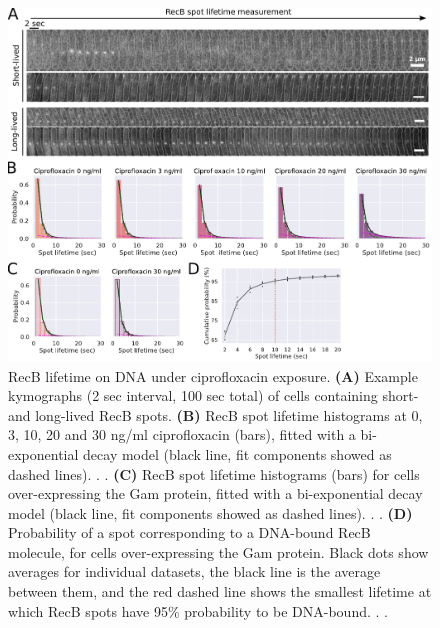 \begin{figure}[htbp]
    \centering
    \includegraphics[width=.8\textwidth]{Figures/Fig2_RecB_lifetime.pdf}
    \caption{RecB lifetime on DNA under ciprofloxacin exposure. \textbf{(A)} Example kymographs (2 sec interval, 100 sec total) of cells containing short- and long-lived RecB spots. \textbf{(B)} RecB spot lifetime histograms at 0, 3, 10, 20 and 30 ng/ml ciprofloxacin (bars), fitted with a bi-exponential decay model (black line, fit components showed as dashed lines). . . \textbf{(C)} RecB spot lifetime histograms (bars) for cells over-expressing the Gam protein, fitted with a bi-exponential decay model (black line, fit components showed as dashed lines). . . \textbf{(D)} Probability of a spot corresponding to a DNA-bound RecB molecule, for cells over-expressing the Gam protein. Black dots show averages for individual datasets, the black line is the average between them, and the red dashed line shows the smallest lifetime at which RecB spots have 95\% probability to be DNA-bound. . .}
    \label{Fig:lifetimes}
\end{figure}


